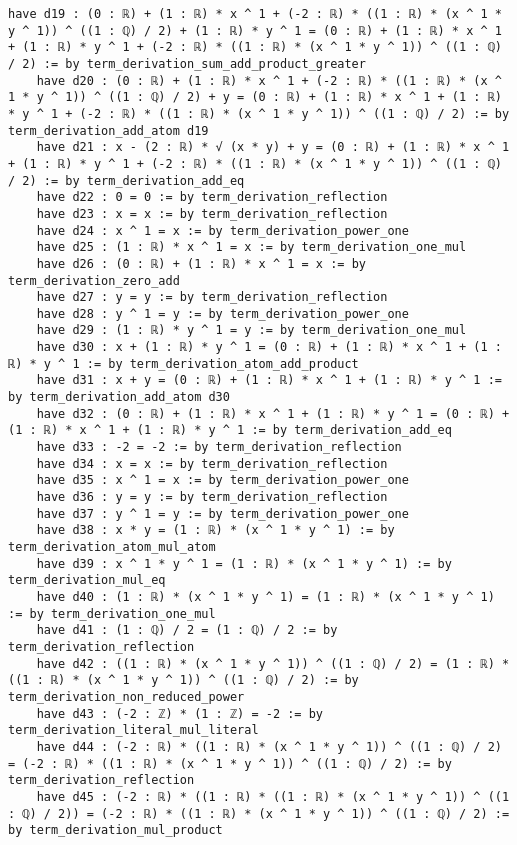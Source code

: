 \documentclass{article}
\begin{document}
\begin{tcolorbox}[colback=white!10, width=\linewidth]
\begin{lstlisting}[language=Lean4]
    have d19 : (0 : ℝ) + (1 : ℝ) * x ^ 1 + (-2 : ℝ) * ((1 : ℝ) * (x ^ 1 * y ^ 1)) ^ ((1 : ℚ) / 2) + (1 : ℝ) * y ^ 1 = (0 : ℝ) + (1 : ℝ) * x ^ 1 + (1 : ℝ) * y ^ 1 + (-2 : ℝ) * ((1 : ℝ) * (x ^ 1 * y ^ 1)) ^ ((1 : ℚ) / 2) := by term_derivation_sum_add_product_greater
    have d20 : (0 : ℝ) + (1 : ℝ) * x ^ 1 + (-2 : ℝ) * ((1 : ℝ) * (x ^ 1 * y ^ 1)) ^ ((1 : ℚ) / 2) + y = (0 : ℝ) + (1 : ℝ) * x ^ 1 + (1 : ℝ) * y ^ 1 + (-2 : ℝ) * ((1 : ℝ) * (x ^ 1 * y ^ 1)) ^ ((1 : ℚ) / 2) := by term_derivation_add_atom d19
    have d21 : x - (2 : ℝ) * √ (x * y) + y = (0 : ℝ) + (1 : ℝ) * x ^ 1 + (1 : ℝ) * y ^ 1 + (-2 : ℝ) * ((1 : ℝ) * (x ^ 1 * y ^ 1)) ^ ((1 : ℚ) / 2) := by term_derivation_add_eq
    have d22 : 0 = 0 := by term_derivation_reflection
    have d23 : x = x := by term_derivation_reflection
    have d24 : x ^ 1 = x := by term_derivation_power_one
    have d25 : (1 : ℝ) * x ^ 1 = x := by term_derivation_one_mul
    have d26 : (0 : ℝ) + (1 : ℝ) * x ^ 1 = x := by term_derivation_zero_add
    have d27 : y = y := by term_derivation_reflection
    have d28 : y ^ 1 = y := by term_derivation_power_one
    have d29 : (1 : ℝ) * y ^ 1 = y := by term_derivation_one_mul
    have d30 : x + (1 : ℝ) * y ^ 1 = (0 : ℝ) + (1 : ℝ) * x ^ 1 + (1 : ℝ) * y ^ 1 := by term_derivation_atom_add_product
    have d31 : x + y = (0 : ℝ) + (1 : ℝ) * x ^ 1 + (1 : ℝ) * y ^ 1 := by term_derivation_add_atom d30
    have d32 : (0 : ℝ) + (1 : ℝ) * x ^ 1 + (1 : ℝ) * y ^ 1 = (0 : ℝ) + (1 : ℝ) * x ^ 1 + (1 : ℝ) * y ^ 1 := by term_derivation_add_eq
    have d33 : -2 = -2 := by term_derivation_reflection
    have d34 : x = x := by term_derivation_reflection
    have d35 : x ^ 1 = x := by term_derivation_power_one
    have d36 : y = y := by term_derivation_reflection
    have d37 : y ^ 1 = y := by term_derivation_power_one
    have d38 : x * y = (1 : ℝ) * (x ^ 1 * y ^ 1) := by term_derivation_atom_mul_atom
    have d39 : x ^ 1 * y ^ 1 = (1 : ℝ) * (x ^ 1 * y ^ 1) := by term_derivation_mul_eq
    have d40 : (1 : ℝ) * (x ^ 1 * y ^ 1) = (1 : ℝ) * (x ^ 1 * y ^ 1) := by term_derivation_one_mul
    have d41 : (1 : ℚ) / 2 = (1 : ℚ) / 2 := by term_derivation_reflection
    have d42 : ((1 : ℝ) * (x ^ 1 * y ^ 1)) ^ ((1 : ℚ) / 2) = (1 : ℝ) * ((1 : ℝ) * (x ^ 1 * y ^ 1)) ^ ((1 : ℚ) / 2) := by term_derivation_non_reduced_power
    have d43 : (-2 : ℤ) * (1 : ℤ) = -2 := by term_derivation_literal_mul_literal
    have d44 : (-2 : ℝ) * ((1 : ℝ) * (x ^ 1 * y ^ 1)) ^ ((1 : ℚ) / 2) = (-2 : ℝ) * ((1 : ℝ) * (x ^ 1 * y ^ 1)) ^ ((1 : ℚ) / 2) := by term_derivation_reflection
    have d45 : (-2 : ℝ) * ((1 : ℝ) * ((1 : ℝ) * (x ^ 1 * y ^ 1)) ^ ((1 : ℚ) / 2)) = (-2 : ℝ) * ((1 : ℝ) * (x ^ 1 * y ^ 1)) ^ ((1 : ℚ) / 2) := by term_derivation_mul_product

\end{lstlisting}
\end{tcolorbox}
\end{document}
